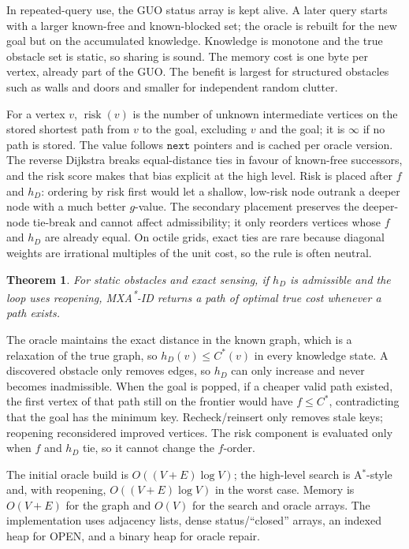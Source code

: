 \documentclass[conference]{IEEEtran}
\newcommand{\hD}{h_{D}}
\newcommand{\MXAID}{MXA\textsuperscript{*}-ID}
\newtheorem{theorem}{Theorem}
\begin{document}
In repeated-query use, the GUO status array is kept alive. A later query starts with a larger known-free and known-blocked set; the oracle is rebuilt for the new goal but on the accumulated knowledge. Knowledge is monotone and the true obstacle set is static, so sharing is sound. The memory cost is one byte per vertex, already part of the GUO. The benefit is largest for structured obstacles such as walls and doors and smaller for independent random clutter.

For a vertex $v$, $\operatorname{risk}(v)$ is the number of unknown intermediate vertices on the stored shortest path from $v$ to the goal, excluding $v$ and the goal; it is $\infty$ if no path is stored. The value follows $\texttt{next}$ pointers and is cached per oracle version. The reverse Dijkstra breaks equal-distance ties in favour of known-free successors, and the risk score makes that bias explicit at the high level. Risk is placed after $f$ and $\hD$: ordering by risk first would let a shallow, low-risk node outrank a deeper node with a much better $g$-value. The secondary placement preserves the deeper-node tie-break and cannot affect admissibility; it only reorders vertices whose $f$ and $\hD$ are already equal. On octile grids, exact ties are rare because diagonal weights are irrational multiples of the unit cost, so the rule is often neutral.

\begin{theorem}
For static obstacles and exact sensing, if $\hD$ is admissible and the loop uses reopening, \MXAID{} returns a path of optimal true cost whenever a path exists.
\end{theorem}
\begin{IEEEproof}
The oracle maintains the exact distance in the known graph, which is a relaxation of the true graph, so $\hD(v)\le C^*(v)$ in every knowledge state. A discovered obstacle only removes edges, so $\hD$ can only increase and never becomes inadmissible. When the goal is popped, if a cheaper valid path existed, the first vertex of that path still on the frontier would have $f\le C^*$, contradicting that the goal has the minimum key. Recheck/reinsert only removes stale keys; reopening reconsidered improved vertices. The risk component is evaluated only when $f$ and $\hD$ tie, so it cannot change the $f$-order.
\end{IEEEproof}

The initial oracle build is $O((V+E)\log V)$; the high-level search is A$^*$-style and, with reopening, $O((V+E)\log V)$ in the worst case. Memory is $O(V+E)$ for the graph and $O(V)$ for the search and oracle arrays. The implementation uses adjacency lists, dense status/``closed'' arrays, an indexed heap for OPEN, and a binary heap for oracle repair.
\end{document}
